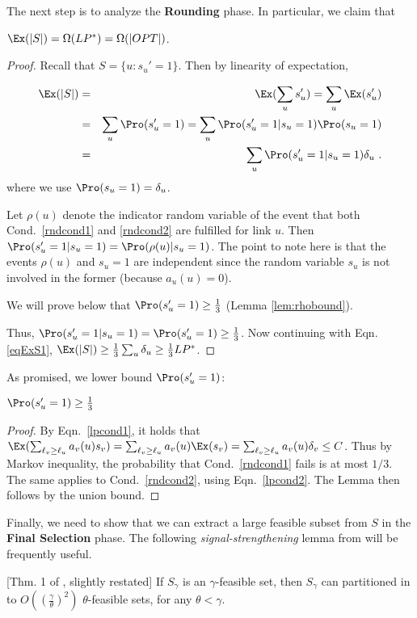 \documentclass[11pt]{amsart}
\begin{document}
The next step is to analyze the {\bf Rounding} phase. In particular, we claim that 
\begin{lemma}
$\Ex(|S|) = \Omega(LP^*) = \Omega(|OPT|)$.
\end{lemma}
\begin{proof}
Recall that $S = \{u : s_u' = 1\}$. Then
by linearity of expectation, 

\begin{eqnarray}
\Ex(|S|) &=& \Ex(\sum_u s'_u) = \sum_u \Ex(s'_u) \nonumber \\ &=& \sum_u  \Pro(s'_u = 1) = \sum_u \Pro(s'_u = 1 | s_u = 1) \Pro(s_u = 1) \nonumber \\ &=& \sum_u \Pro(s'_u = 1 | s_u = 1) \delta_u \label{eqExS1} \ .
\end{eqnarray}
where we use $\Pro(s_u = 1) = \delta_u$.

Let $\rho(u)$ denote the indicator random variable of the event that both Cond.\ 
\ref{rndcond1} and \ref{rndcond2} are fulfilled for link $u$. Then  $\Pro(s'_u = 1 | s_u = 1) =  \Pro(\rho(u) | s_u = 1)$.
The point to note here is that the events $\rho(u)$ and $s_u = 1$ are independent since
the random variable $s_u$ is not involved in the former (because $a_u(u) = 0$). 

We will prove below that $\Pro(s'_u = 1) \geq  \frac{1}{3}$ (Lemma \ref{lem:rhobound}).

Thus, $\Pro(s'_u = 1 | s_u = 1)  = \Pro(s'_u = 1) \geq  \frac{1}{3}$. Now continuing with Eqn. \ref{eqExS1},  $\Ex(|S|) \geq \frac{1}{3} \sum_{u} \delta_u\geq \frac{1}{3} LP^*$.

\end{proof}


As promised, we lower bound $\Pro(s'_u = 1)$:
\begin{lemma}
$\Pro(s'_u = 1) \geq \frac{1}{3}$
\label{lem:rhobound}
\end{lemma}
\begin{proof}
By  Eqn.~\ref{lpcond1}, it holds that
$\Ex(\sum_{\ell_v \geq \ell_u} a_v(u) s_v) = \sum_{\ell_v \geq \ell_u}
a_v(u) \Ex(s_v) = \sum_{\ell_v \geq \ell_u} a_v(u) \delta_v \leq C$.
Thus by Markov inequality, the probability that Cond.\ \ref{rndcond1} 
fails is at most $1/3$.
The same applies to Cond.\ \ref{rndcond2}, using Eqn.~\ref{lpcond2}.
The Lemma then follows by the union bound. 
\end{proof}


Finally, we need to show that we can extract a large feasible subset from $S$ in the {\bf Final Selection} phase. 
The following \emph{signal-strengthening} lemma from \cite{HW09}
will be frequently useful.
\begin{lemma}{[Thm. 1 of \cite{HW09}, slightly restated]}
If $S_\gamma$ is an $\gamma$-feasible set, 
then $S_\gamma$ can partitioned in to $O(\left(\frac{\gamma}{\theta}\right)^2)$ $\theta$-feasible sets,
for any $\theta < \gamma$.
\label{lem:signal}
\end{lemma}
\end{document}
